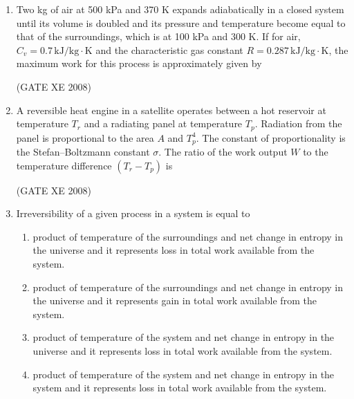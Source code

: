 \documentclass[12pt]{article}
\begin{document}
\begin{enumerate}
\item  Two kg of air at 500 kPa and 370 K expands adiabatically in a closed system until its volume is doubled and its pressure and temperature become equal to that of the surroundings, which is at 100 kPa and 300 K. If for air, $C_v = 0.7 \, \mathrm{kJ/kg \cdot K}$ and the characteristic gas constant $R = 0.287 \, \mathrm{kJ/kg \cdot K}$, the maximum work for this process is approximately given by

\begin{enumerate}
\end{enumerate}

(GATE XE 2008)

\item  A reversible heat engine in a satellite operates between a hot reservoir at temperature $T_r$ and a radiating panel at temperature $T_p$. Radiation from the panel is proportional to the area $A$ and $T_p^4$. The constant of proportionality is the Stefan–Boltzmann constant $\sigma$. The ratio of the work output $W$ to the temperature difference $(T_r - T_p)$ is  

\begin{enumerate}
\end{enumerate}

(GATE XE 2008)

\item Irreversibility of a given process in a system is equal to  

\begin{enumerate}
\item  product of temperature of the surroundings and net change in entropy in the universe and it represents loss in total work available from the system.  
 \item  product of temperature of the surroundings and net change in entropy in the universe and it represents gain in total work available from the system.  
 \item  product of temperature of the system and net change in entropy in the universe and it represents loss in total work available from the system. 
  \item  product of temperature of the system and net change in entropy in the system and it represents loss in total work available from the system.
 \end{enumerate}
 

\end{enumerate}
\end{document}
